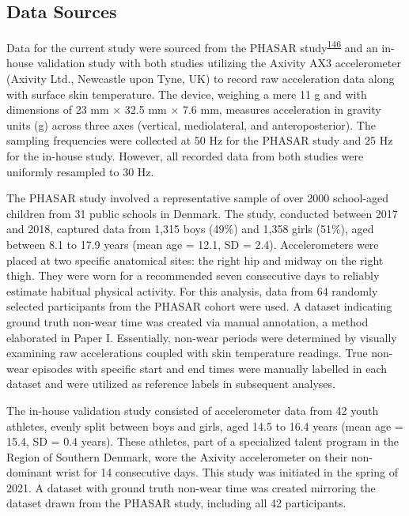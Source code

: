 \documentclass[
  10pt,
]{scrbook}
\begin{document}
\hypertarget{data-sources}{%
\subsection{Data Sources}\label{data-sources}}

Data for the current study were sourced from the PHASAR
study\textsuperscript{\protect\hyperlink{ref-pedersen_protocol_2018}{146}}
and an in-house validation study with both studies utilizing the Axivity
AX3 accelerometer (Axivity Ltd., Newcastle upon Tyne, UK) to record raw
acceleration data along with surface skin temperature. The device,
weighing a mere 11 g and with dimensions of 23 mm × 32.5 mm × 7.6 mm,
measures acceleration in gravity units (g) across three axes (vertical,
mediolateral, and anteroposterior). The sampling frequencies were
collected at 50 Hz for the PHASAR study and 25 Hz for the in-house
study. However, all recorded data from both studies were uniformly
resampled to 30 Hz.

The PHASAR study involved a representative sample of over 2000
school-aged children from 31 public schools in Denmark. The study,
conducted between 2017 and 2018, captured data from 1,315 boys (49\%)
and 1,358 girls (51\%), aged between 8.1 to 17.9 years (mean age = 12.1,
SD = 2.4). Accelerometers were placed at two specific anatomical sites:
the right hip and midway on the right thigh. They were worn for a
recommended seven consecutive days to reliably estimate habitual
physical activity. For this analysis, data from 64 randomly selected
participants from the PHASAR cohort were used. A dataset indicating
ground truth non-wear time was created via manual annotation, a method
elaborated in Paper I. Essentially, non-wear periods were determined by
visually examining raw accelerations coupled with skin temperature
readings. True non-wear episodes with specific start and end times were
manually labelled in each dataset and were utilized as reference labels
in subsequent analyses.

The in-house validation study consisted of accelerometer data from 42
youth athletes, evenly split between boys and girls, aged 14.5 to 16.4
years (mean age = 15.4, SD = 0.4 years). These athletes, part of a
specialized talent program in the Region of Southern Denmark, wore the
Axivity accelerometer on their non-dominant wrist for 14 consecutive
days. This study was initiated in the spring of 2021. A dataset with
ground truth non-wear time was created mirroring the dataset drawn from
the PHASAR study, including all 42 participants.
\end{document}
